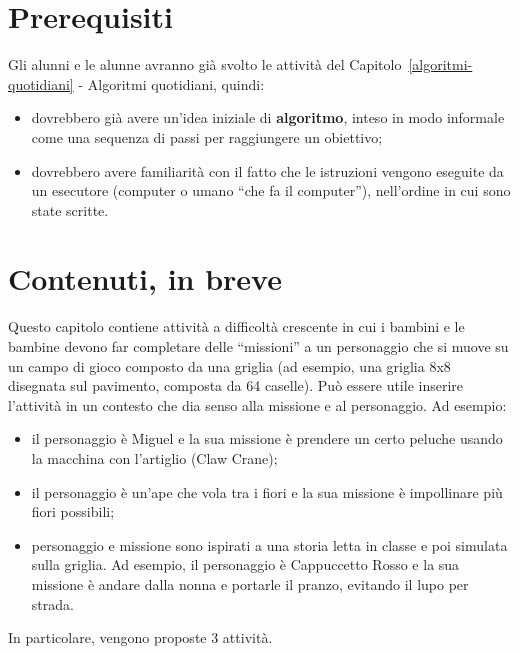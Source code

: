 \section{Prerequisiti }\label{prerequisiti-1}

Gli alunni e le alunne avranno già svolto le attività del Capitolo~\ref{algoritmi-quotidiani} - Algoritmi quotidiani, quindi:

\begin{itemize}
\item
  dovrebbero già avere un'idea iniziale di \textbf{algoritmo}, inteso in modo informale come una sequenza di passi per raggiungere un obiettivo;
\item
  dovrebbero avere familiarità con il fatto che le istruzioni vengono eseguite da un esecutore (computer o umano ``che fa il computer''), nell'ordine in cui sono state scritte.
\end{itemize}

\section{Contenuti, in breve }\label{contenuti-in-breve-1}

Questo capitolo contiene attività a difficoltà crescente in cui i bambini e le bambine devono far completare delle ``missioni'' a un personaggio che si muove su un campo di gioco composto da una griglia (ad esempio, una griglia 8x8 disegnata sul pavimento, composta da 64 caselle). Può essere utile inserire l'attività in un contesto che dia senso alla missione e al personaggio. Ad esempio:

\begin{itemize}
\item
  il personaggio è Miguel e la sua missione è prendere un certo peluche usando la macchina con l'artiglio (Claw Crane);



\item il personaggio è un'ape che vola tra i fiori e la sua missione è impollinare più fiori possibili;



\item
  personaggio e missione sono ispirati a una storia letta in classe e poi simulata sulla griglia. Ad esempio, il personaggio è Cappuccetto Rosso e la sua missione è andare dalla nonna e portarle il pranzo, evitando il lupo per strada.
\end{itemize}

In particolare, vengono proposte 3 attività.

